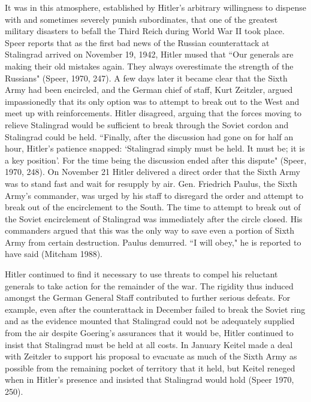 \documentclass[11pt,]{article}
\begin{document}
It was in this atmosphere, established by Hitler's arbitrary willingness to dispense with and sometimes severely punish subordinates, that one of the greatest military disasters to befall the Third Reich during World War II took place.  Speer reports that as the first bad news of the Russian counterattack at Stalingrad arrived on November 19, 1942, Hitler mused that ``Our generals are making their old mistakes again.  They always overestimate the strength of the Russians" (Speer, 1970, 247).  A few days later it became clear that the Sixth Army had been encircled, and the German chief of staff, Kurt Zeitzler, argued impassionedly that its only option was to attempt to break out to the West and meet up with reinforcements.  Hitler disagreed, arguing that the forces moving to relieve Stalingrad would be sufficient to break through the Soviet cordon and Stalingrad could be held.  ``Finally, after the discussion had gone on for half an hour, Hitler's patience snapped:  `Stalingrad simply must be held.  It must be; it is a key position'.  For the time being the discussion ended after this dispute" (Speer, 1970, 248).  On November 21 Hitler delivered a direct order that the Sixth Army was to stand fast and wait for resupply by air.  Gen. Friedrich Paulus, the Sixth Army's commander, was urged by his staff to disregard the order and attempt to break out of the encirclement to the South.  The time to attempt to break out of the Soviet encirclement of Stalingrad was immediately after the circle closed.  His commanders argued that this was the only way to save even a portion of Sixth Army from certain destruction.  Paulus demurred.  ``I will obey," he is reported to have said (Mitcham 1988).



Hitler continued to find it necessary to use threats to compel his reluctant generals to take action for the remainder of the war.  The rigidity thus induced amongst the German General Staff contributed to further serious defeats.  For example, even after the counterattack in December failed to break the Soviet ring and as the evidence mounted that Stalingrad could not be adequately supplied from the air despite Goering's assurances that it would be, Hitler continued to insist that Stalingrad must be held at all costs.  In January Keitel made a deal with Zeitzler to support his proposal to evacuate as much of the Sixth Army as possible from the remaining pocket of territory that it held, but Keitel reneged when in Hitler's presence and insisted that Stalingrad would hold (Speer 1970, 250).
\end{document}

